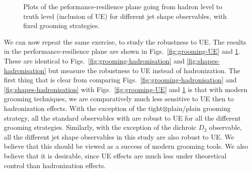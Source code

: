 \documentclass[11pt,letterpaper]{article}
\DeclareRobustCommand{\Figs}[2]{Figs.~\ref{#1} and \ref{#2}}
\begin{document}
\begin{figure}
  \caption{Plots of the peformance-resilience plane going from hadron level to truth level (inclusion of UE) for different jet shape observables, with fixed grooming strategies.}\label{fig:shapes-UE}
\end{figure}


We can now repeat the same exercise, to study the robustness to UE. The results in the performance-resilience plane are shown in \Figs{fig:grooming-UE}{fig:shapes-UE}. These are identical to \Figs{fig:grooming-hadronisation}{fig:shapes-hadronisation} but measure the robustness to UE instead of hadronization. The first thing that is clear from comparing \Figs{fig:grooming-hadronisation}{fig:shapes-hadronisation} with  \Figs{fig:grooming-UE}{fig:shapes-UE} is that with modern grooming techniques, we are comparatively much less sensitive to UE then to hadronization effects. With the exception of the tight$\otimes$plain/plain grooming strategy, all the standard observables with are robust to UE for all the different grooming strategies. Similarly, with the exception of the dichroic $D_2$ observable, all the different jet shape observables in this study are also robust to UE. We believe that this should be viewed as a success of modern grooming tools. We also believe that it is desirable, since UE effects are much less under theoretical control than hadronization effects. 
\end{document}
